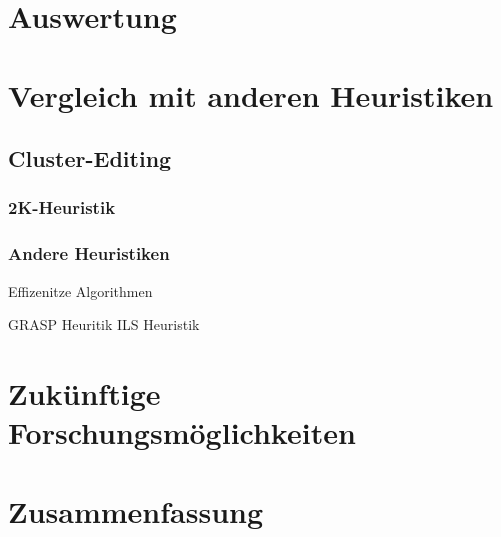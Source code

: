 \documentclass[12pt,a4paper,onecolumn,oneside,titlepage]{article}
\begin{document}
\section{Auswertung}
\section{Vergleich mit anderen Heuristiken}
\subsection{Cluster-Editing}
\subsubsection{2K-Heuristik}
\subsubsection{Andere Heuristiken}
\cite{Bastos2014} Effizenitze Algorithmen

 GRASP Heuritik
 ILS Heuristik

\section{Zukünftige Forschungsmöglichkeiten}
\section{Zusammenfassung}




\end{document}
